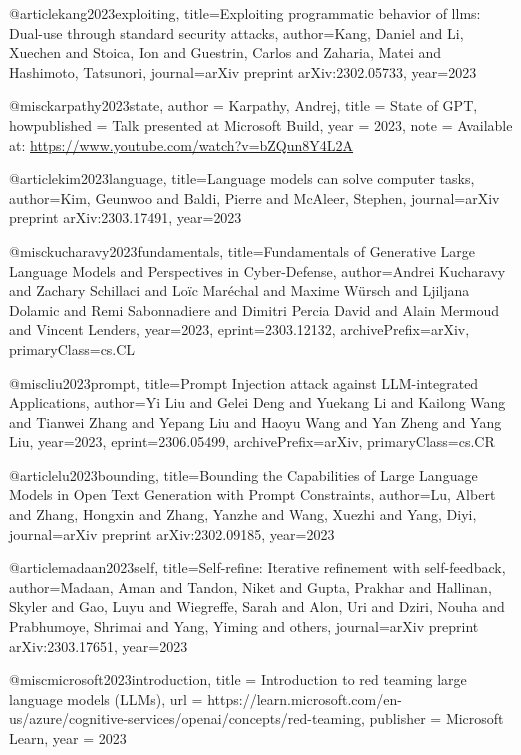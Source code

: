 @article{kang2023exploiting,
  title={Exploiting programmatic behavior of llms: Dual-use through standard security attacks},
  author={Kang, Daniel and Li, Xuechen and Stoica, Ion and Guestrin, Carlos and Zaharia, Matei and Hashimoto, Tatsunori},
  journal={arXiv preprint arXiv:2302.05733},
  year={2023}
}

@misc{karpathy2023state,
  author = {Karpathy, Andrej},
  title = {State of GPT},
  howpublished = {Talk presented at Microsoft Build},
  year = {2023},
  note = {Available at: \url{https://www.youtube.com/watch?v=bZQun8Y4L2A}}
}

@article{kim2023language,
  title={Language models can solve computer tasks},
  author={Kim, Geunwoo and Baldi, Pierre and McAleer, Stephen},
  journal={arXiv preprint arXiv:2303.17491},
  year={2023}
}

@misc{kucharavy2023fundamentals,
      title={Fundamentals of Generative Large Language Models and Perspectives in Cyber-Defense},
      author={Andrei Kucharavy and Zachary Schillaci and Loïc Maréchal and Maxime Würsch and Ljiljana Dolamic and Remi Sabonnadiere and Dimitri Percia David and Alain Mermoud and Vincent Lenders},
      year={2023},
      eprint={2303.12132},
      archivePrefix={arXiv},
      primaryClass={cs.CL}
}

@misc{liu2023prompt,
      title={Prompt Injection attack against LLM-integrated Applications},
      author={Yi Liu and Gelei Deng and Yuekang Li and Kailong Wang and Tianwei Zhang and Yepang Liu and Haoyu Wang and Yan Zheng and Yang Liu},
      year={2023},
      eprint={2306.05499},
      archivePrefix={arXiv},
      primaryClass={cs.CR}
}

@article{lu2023bounding,
  title={Bounding the Capabilities of Large Language Models in Open Text Generation with Prompt Constraints},
  author={Lu, Albert and Zhang, Hongxin and Zhang, Yanzhe and Wang, Xuezhi and Yang, Diyi},
  journal={arXiv preprint arXiv:2302.09185},
  year={2023}
}

@article{madaan2023self,
  title={Self-refine: Iterative refinement with self-feedback},
  author={Madaan, Aman and Tandon, Niket and Gupta, Prakhar and Hallinan, Skyler and Gao, Luyu and Wiegreffe, Sarah and Alon, Uri and Dziri, Nouha and Prabhumoye, Shrimai and Yang, Yiming and others},
  journal={arXiv preprint arXiv:2303.17651},
  year={2023}
}

@misc{microsoft2023introduction,
  title = {Introduction to red teaming large language models (LLMs)},
  url = {https://learn.microsoft.com/en-us/azure/cognitive-services/openai/concepts/red-teaming},
  publisher = {Microsoft Learn},
  year = {2023}
}

